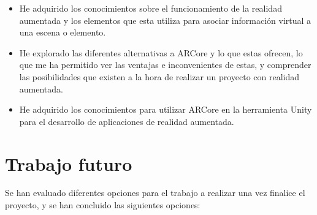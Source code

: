\begin{itemize}
  \item He adquirido los conocimientos sobre el funcionamiento de la realidad aumentada y los elementos que esta utiliza para asociar información virtual a una escena o elemento.

  \item He explorado las diferentes alternativas a ARCore y lo que estas ofrecen, lo que me ha permitido ver las ventajas e inconvenientes de estas, y comprender las posibilidades que existen a la hora de realizar un proyecto con realidad aumentada.

  \item He adquirido los conocimientos para utilizar ARCore en la herramienta Unity para el desarrollo de aplicaciones de realidad aumentada.

\end{itemize}

\section{Trabajo futuro}
Se han evaluado diferentes opciones para el trabajo a realizar una vez finalice el proyecto, y se han concluido las siguientes opciones:

